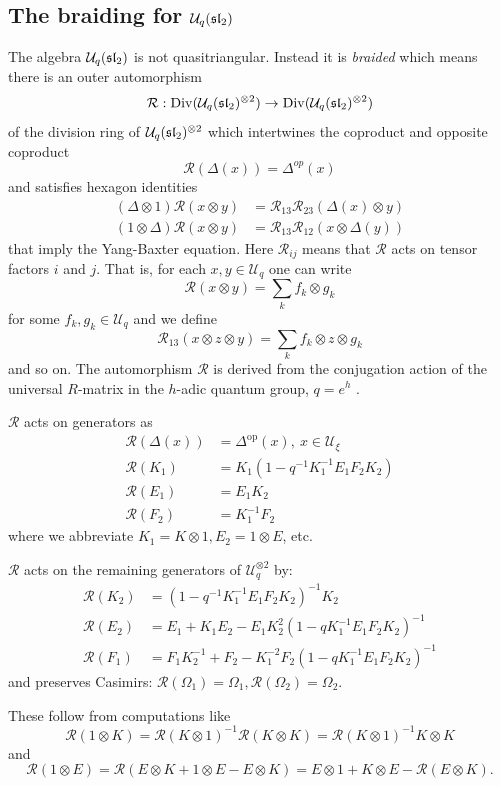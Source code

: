 \documentclass{sl2ams}
\numberwithin{equation}{section}
\newcommand{\U}{\mathcal{U}}
\newcommand{\R}{\mathcal{R}}
\begin{document}
\subsection{The braiding for \texorpdfstring{$\U_q(\sla)$}{Uq(sl2)}}
\label{sec:outer-R-matrix}
The algebra $\U_q(\sla)$ is not quasitriangular.
Instead it is \emph{braided} \cite{Reshetikhin1995} which means there is an outer automorphism 
\[
 \R :  \Div(\U_q(\sla)^{\otimes 2}) \to \Div(\U_q(\sla)^{\otimes 2})
 \]
of the division ring of $\U_q(\sla)^{\otimes 2}$ which intertwines the coproduct and opposite coproduct
\begin{equation*}
  \R(\Delta(x)) =  \Delta^{op}(x)
\end{equation*}
and satisfies hexagon identities
\begin{align*}
  (\Delta \otimes 1) \R(x \otimes y) &= \R_{13} \R_{23} (\Delta(x) \otimes y) \\
  (1 \otimes \Delta) \R(x \otimes y) &= \R_{13} \R_{12} (x \otimes \Delta(y))
\end{align*}
that imply the Yang-Baxter equation.
Here $\R_{ij}$ means that $\R$ acts on tensor factors $i$ and $j$.
That is, for each \(x, y \in \U_q\) one can write
\[
  \R(x \otimes y) = \sum_k f_k \otimes g_k
\]
for some \(f_k, g_k \in \U_q\) and we define
\[
  \R_{13}(x \otimes z \otimes y) = \sum_k f_k \otimes z \otimes g_k
\]
and so on.%
The automorphism \(\R\) is derived from the conjugation action of the universal \(R\)-matrix in the \(h\)-adic quantum group, \(q = e^h\) \cite{Kashaev2004}.

$\R$ acts on generators as
\begin{align*}
  \R(\Delta(x)) &= \Delta^{\operatorname{op}}(x), \ x \in \U_\xi \\
  \R(K_1) &= K_1 (1  - q^{-1} K_1^{-1} E_1 F_2 K_2 ) \\
  \R(E_1) &= E_1 K_2 \\
  \R(F_2) &= K_1^{-1} F_2
\end{align*}
where we abbreviate $K_1 = K \otimes 1, E_2 = 1 \otimes E$, etc.
\begin{proposition}
  $\R$ acts on the remaining generators of $\U_q^{\otimes 2}$ by:
  \begin{align*}
    \R(K_2) &= (1 - q^{-1} K_1^{-1} E_1 F_2 K_2)^{-1} K_2 \\
    \R(E_2) &= E_1 + K_1 E_2 - E_1 K_2^2 (1 - q K_1^{-1} E_1 F_2 K_2)^{-1} \\
    \R(F_1) &= F_1 K_2^{-1} + F_2 - K_1^{-2} F_2(1 - q K_1^{-1} E_1 F_2 K_2)^{-1}
  \end{align*}
  and preserves Casimirs:
  \(
    \R(\Omega_1) = \Omega_1, \R(\Omega_2) = \Omega_2.
  \)
\end{proposition}
These follow from computations like
\[
  \R(1 \otimes K) = \R(K \otimes 1)^{-1} \R(K \otimes K) = \R(K \otimes 1)^{-1} K \otimes K
\]
and
\[
  \R(1 \otimes E) = \R(E \otimes K + 1 \otimes E - E \otimes K) = E \otimes 1 + K \otimes E - \R(E \otimes K).
\]
\end{document}

